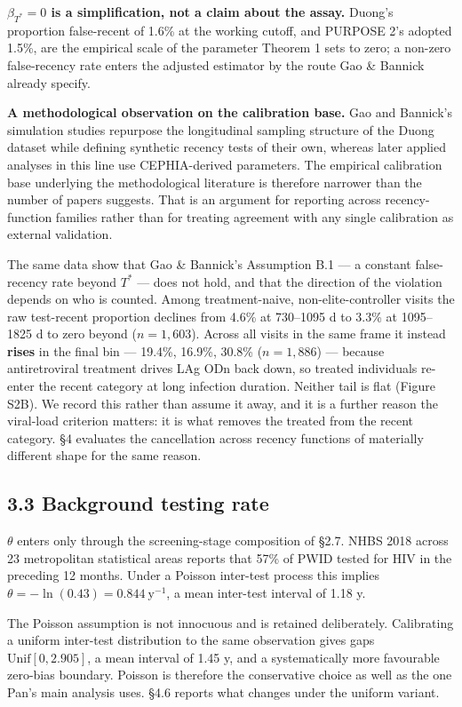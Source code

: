 \textbf{\(\beta_{T^*}=0\) is a simplification, not a claim about the assay.} Duong's proportion false-recent of 1.6\% at the working cutoff, and PURPOSE 2's adopted 1.5\%, are the empirical scale of the parameter Theorem 1 sets to zero; a non-zero false-recency rate enters the adjusted estimator by the route Gao \& Bannick already specify.

\textbf{A methodological observation on the calibration base.} Gao and Bannick's simulation studies repurpose the longitudinal sampling structure of the Duong dataset while defining synthetic recency tests of their own, whereas later applied analyses in this line use CEPHIA-derived parameters. The empirical calibration base underlying the methodological literature is therefore narrower than the number of papers suggests. That is an argument for reporting across recency-function families rather than for treating agreement with any single calibration as external validation.

The same data show that Gao \& Bannick's Assumption B.1 --- a constant false-recency rate beyond \(T^*\) --- does not hold, and that the direction of the violation depends on who is counted. Among treatment-naive, non-elite-controller visits the raw test-recent proportion declines from 4.6\% at 730--1095 d to 3.3\% at 1095--1825 d to zero beyond (\(n=1{,}603\)). Across all visits in the same frame it instead \textbf{rises} in the final bin --- 19.4\%, 16.9\%, 30.8\% (\(n=1{,}886\)) --- because antiretroviral treatment drives LAg ODn back down, so treated individuals re-enter the recent category at long infection duration. Neither tail is flat (Figure S2B). We record this rather than assume it away, and it is a further reason the viral-load criterion matters: it is what removes the treated from the recent category. §4 evaluates the cancellation across recency functions of materially different shape for the same reason.

\subsection{3.3 Background testing rate}

\(\theta\) enters only through the screening-stage composition of §2.7. NHBS 2018 across 23 metropolitan statistical areas reports that 57\% of PWID tested for HIV in the preceding 12 months. Under a Poisson inter-test process this implies \(\theta=-\ln(0.43)=0.844\ \mathrm{y}^{-1}\), a mean inter-test interval of 1.18 y.

The Poisson assumption is not innocuous and is retained deliberately. Calibrating a uniform inter-test distribution to the same observation gives gaps \(\mathrm{Unif}[0,2.905]\), a mean interval of 1.45 y, and a systematically more favourable zero-bias boundary. Poisson is therefore the conservative choice as well as the one Pan's main analysis uses. §4.6 reports what changes under the uniform variant.

